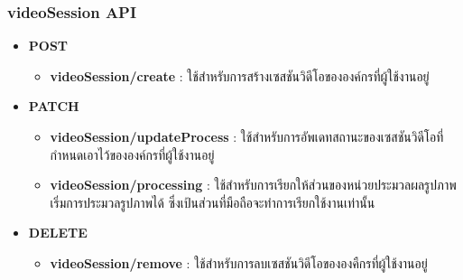 \subsubsection{videoSession API}

\ifenglish
\else
\begin{itemize}
    \item \textbf{POST}
    \begin{itemize}
        \item \textbf{videoSession/create} : ใช้สำหรับการสร้างเซสชันวิดีโอขององค์กรที่ผู้ใช้งานอยู่
    \end{itemize}
    \item \textbf{PATCH}
    \begin{itemize}
        \item \textbf{videoSession/updateProcess} : ใช้สำหรับการอัพเดทสถานะของเซสชันวิดีโอที่กำหนดเอาไว้ขององค์กรที่ผู้ใช้งานอยู่
        \item \textbf{videoSession/processing} : ใช้สำหรับการเรียกให้ส่วนของหน่วยประมวลผลรูปภาพเริ่มการประมวลรูปภาพได้ ซึ่งเป้นส่วนที่มือถือจะทำการเรียกใช้งานเท่านั้น
    \end{itemize}
    \item \textbf{DELETE}
    \begin{itemize}
        \item \textbf{videoSession/remove} : ใช้สำหรับการลบเซสชันวิดีโอขององคืกรที่ผู้ใช้งานอยู่
    \end{itemize}
\end{itemize}
\fi